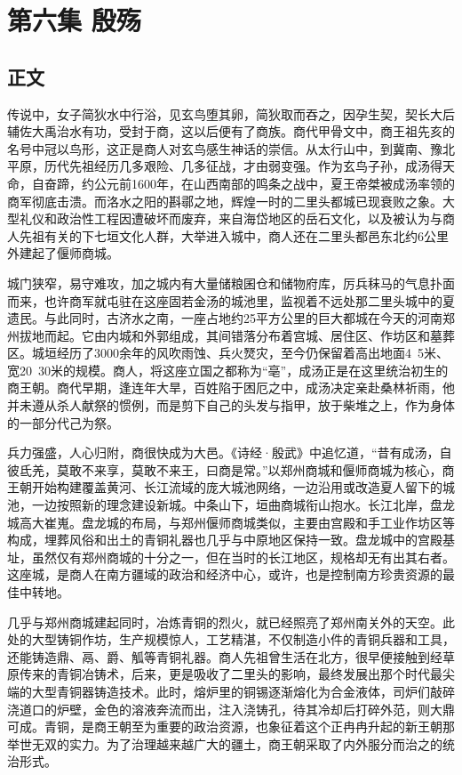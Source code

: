 \chapter{第六集 \quad 殷殇}

\section{正文}

传说中，女子简狄水中行浴，见玄鸟堕其卵，简狄取而吞之，因孕生契，契长大后辅佐大禹治水有功，受封于商，这以后便有了商族。商代甲骨文中，商王祖先亥的名号中冠以鸟形，这正是商人对玄鸟感生神话的崇信。从太行山中，到冀南、豫北平原，历代先祖经历几多艰险、几多征战，才由弱变强。作为玄鸟子孙，成汤得天命，自奋蹄，约公元前1600年，在山西南部的鸣条之战中，夏王帝桀被成汤率领的商军彻底击溃。而洛水之阳的斟鄩之地，辉煌一时的二里头都城已现衰败之象。大型礼仪和政治性工程因遭破坏而废弃，来自海岱地区的岳石文化，以及被认为与商人先祖有关的下七垣文化人群，大举进入城中，商人还在二里头都邑东北约6公里外建起了偃师商城。

城门狭窄，易守难攻，加之城内有大量储粮囷仓和储物府库，厉兵秣马的气息扑面而来，也许商军就屯驻在这座固若金汤的城池里，监视着不远处那二里头城中的夏遗民。与此同时，古济水之南，一座占地约25平方公里的巨大都城在今天的河南郑州拔地而起。它由内城和外郭组成，其间错落分布着宫城、居住区、作坊区和墓葬区。城垣经历了3000余年的风吹雨蚀、兵火燹灾，至今仍保留着高出地面4~5米、宽20~30米的规模。商人，将这座立国之都称为“亳”，成汤正是在这里统治初生的商王朝。商代早期，逢连年大旱，百姓陷于困厄之中，成汤决定亲赴桑林祈雨，他并未遵从杀人献祭的惯例，而是剪下自己的头发与指甲，放于柴堆之上，作为身体的一部分代己为祭。

兵力强盛，人心归附，商很快成为大邑。《诗经·殷武》中追忆道，“昔有成汤，自彼氐羌，莫敢不来享，莫敢不来王，曰商是常。”以郑州商城和偃师商城为核心，商王朝开始构建覆盖黄河、长江流域的庞大城池网络，一边沿用或改造夏人留下的城池，一边按照新的理念建设新城。中条山下，垣曲商城衔山抱水。长江北岸，盘龙城高大崔嵬。盘龙城的布局，与郑州偃师商城类似，主要由宫殿和手工业作坊区等构成，埋葬风俗和出土的青铜礼器也几乎与中原地区保持一致。盘龙城中的宫殿基址，虽然仅有郑州商城的十分之一，但在当时的长江地区，规格却无有出其右者。这座城，是商人在南方疆域的政治和经济中心，或许，也是控制南方珍贵资源的最佳中转地。

几乎与郑州商城建起同时，冶炼青铜的烈火，就已经照亮了郑州南关外的天空。此处的大型铸铜作坊，生产规模惊人，工艺精湛，不仅制造小件的青铜兵器和工具，还能铸造鼎、鬲、爵、觚等青铜礼器。商人先祖曾生活在北方，很早便接触到经草原传来的青铜冶铸术，后来，更是吸收了二里头的影响，最终发展出那个时代最尖端的大型青铜器铸造技术。此时，熔炉里的铜锡逐渐熔化为合金液体，司炉们敲碎浇道口的炉壁，金色的溶液奔流而出，注入浇铸孔，待其冷却后打碎外范，则大鼎可成。青铜，是商王朝至为重要的政治资源，也象征着这个正冉冉升起的新王朝那举世无双的实力。为了治理越来越广大的疆土，商王朝采取了内外服分而治之的统治形式。

